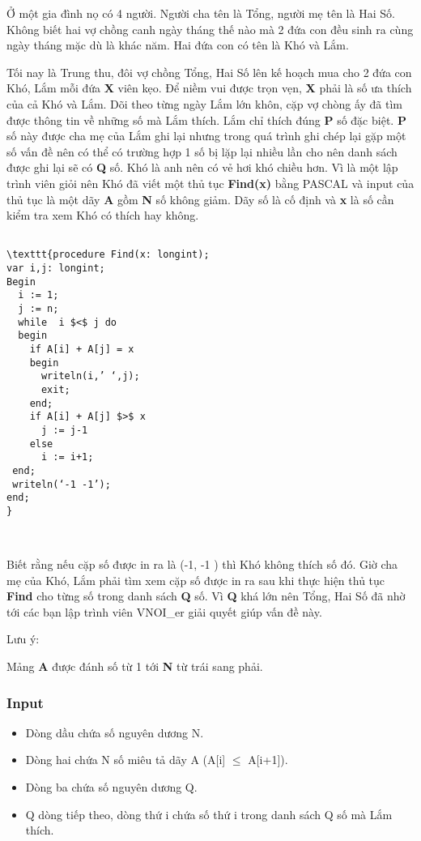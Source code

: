 

Ở một gia đình nọ có 4 người. Người cha tên là Tổng, người mẹ tên là Hai Số. Không biết hai vợ chồng canh ngày tháng thế nào mà 2 đứa con đều sinh ra cùng ngày tháng mặc dù là khác năm. Hai đứa con có tên là Khó và Lắm.

Tối nay là Trung thu, đôi vợ chồng Tổng, Hai Số lên kế hoạch mua cho 2 đứa con Khó, Lắm mỗi đứa \textbf{ X } viên kẹo. Để niềm vui được trọn vẹn, \textbf{ X } phải là số ưa thích của cả Khó và Lắm. Dõi theo từng ngày Lắm lớn khôn, cặp vợ chòng ấy đã tìm được thông tin về những số mà Lắm thích. Lắm chỉ thích đúng \textbf{ P } số đặc biệt. \textbf{ P } số này được cha mẹ của Lắm ghi lại nhưng trong quá trình ghi chép lại gặp một số vấn đề nên có thể có trường hợp 1 số bị lặp lại nhiều lần cho nên danh sách được ghi lại sẽ có \textbf{ Q } số. Khó là anh nên có vẻ hơi khó chiều hơn. Vì là một lập trình viên giỏi nên Khó đã viết một thủ tục \textbf{ Find(x) } bằng PASCAL và input của thủ tục là một dãy \textbf{ A } gồm \textbf{ N } số không giảm. Dãy số là cố định và \textbf{ x } là số cần kiểm tra xem Khó có thích hay không.
\begin{verbatim}

\texttt{procedure Find(x: longint);
var i,j: longint;
Begin
  i := 1;
  j := n;
  while  i $<$ j do
  begin 
    if A[i] + A[j] = x 
    begin
      writeln(i,’ ‘,j); 
      exit;
    end; 
    if A[i] + A[j] $>$ x
      j := j-1
    else 
      i := i+1;
 end;
 writeln(‘-1 -1’);
end;
}\end{verbatim}

 

Biết rằng nếu cặp số được in ra là (-1, -1 ) thì Khó không thích số đó. Giờ cha mẹ của Khó, Lắm phải tìm xem cặp số được in ra sau khi thực hiện thủ tục \textbf{ Find } cho từng số trong danh sách \textbf{ Q } số. Vì \textbf{ Q } khá lớn nên Tổng, Hai Số đã nhờ tới các bạn lập trình viên VNOI\_er giải quyết giúp vấn đề này.

Lưu ý:

Mảng \textbf{ A } được đánh số từ 1 tới \textbf{ N } từ trái sang phải.

\subsubsection{\textbf{Input}}
\begin{itemize}
	\item Dòng dầu chứa số nguyên dương N.
	\item Dòng hai chứa N số miêu tả dãy A (A[i]  $\le$  A[i+1]).
	\item Dòng ba chứa số nguyên dương Q.
	\item Q dòng tiếp theo, dòng thứ i chứa số thứ i trong danh sách Q số mà Lắm thích.
\end{itemize}

